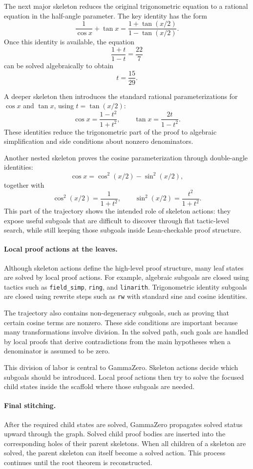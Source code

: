 The next major skeleton reduces the original trigonometric equation to a rational equation in the half-angle parameter. The key identity has the form
\[
\frac{1}{\cos x} + \tan x
=
\frac{1+\tan(x/2)}{1-\tan(x/2)}.
\]
Once this identity is available, the equation
\[
\frac{1+t}{1-t} = \frac{22}{7}
\]
can be solved algebraically to obtain
\[
t = \frac{15}{29}.
\]

A deeper skeleton then introduces the standard rational parameterizations for \(\cos x\) and \(\tan x\), using \(t = \tan(x/2)\):
\[
\cos x = \frac{1-t^2}{1+t^2},
\qquad
\tan x = \frac{2t}{1-t^2}.
\]
These identities reduce the trigonometric part of the proof to algebraic simplification and side conditions about nonzero denominators.

Another nested skeleton proves the cosine parameterization through double-angle identities:
\[
\cos x = \cos^2(x/2) - \sin^2(x/2),
\]
together with
\[
\cos^2(x/2) = \frac{1}{1+t^2},
\qquad
\sin^2(x/2) = \frac{t^2}{1+t^2}.
\]
This part of the trajectory shows the intended role of skeleton actions: they expose useful subgoals that are difficult to discover through flat tactic-level search, while still keeping those subgoals inside Lean-checkable proof structure.

\paragraph{Local proof actions at the leaves.}
Although skeleton actions define the high-level proof structure, many leaf states are solved by local proof actions. For example, algebraic subgoals are closed using tactics such as \texttt{field\_simp}, \texttt{ring}, and \texttt{linarith}. Trigonometric identity subgoals are closed using rewrite steps such as \texttt{rw} with standard sine and cosine identities.

The trajectory also contains non-degeneracy subgoals, such as proving that certain cosine terms are nonzero. These side conditions are important because many transformations involve division. In the solved path, such goals are handled by local proofs that derive contradictions from the main hypotheses when a denominator is assumed to be zero.

This division of labor is central to GammaZero. Skeleton actions decide which subgoals should be introduced. Local proof actions then try to solve the focused child states inside the scaffold where those subgoals are needed.

\paragraph{Final stitching.}
After the required child states are solved, GammaZero propagates solved status upward through the graph. Solved child proof bodies are inserted into the corresponding holes of their parent skeletons. When all children of a skeleton are solved, the parent skeleton can itself become a solved action. This process continues until the root theorem is reconstructed.

